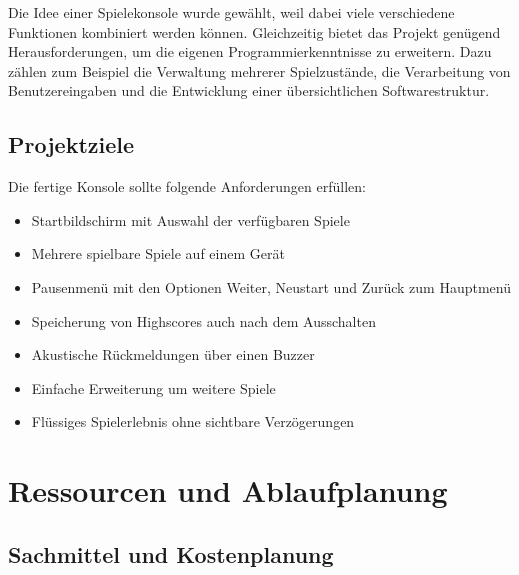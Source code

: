 \documentclass[12pt,a4paper]{article}
\begin{document}
Die Idee einer Spielekonsole wurde gewählt, weil dabei viele verschiedene Funktionen kombiniert werden können. Gleichzeitig bietet das Projekt genügend Herausforderungen, um die eigenen Programmierkenntnisse zu erweitern. Dazu zählen zum Beispiel die Verwaltung mehrerer Spielzustände, die Verarbeitung von Benutzereingaben und die Entwicklung einer übersichtlichen Softwarestruktur.

\subsection{Projektziele}

Die fertige Konsole sollte folgende Anforderungen erfüllen:

\begin{itemize}[noitemsep]
\item Startbildschirm mit Auswahl der verfügbaren Spiele
\item Mehrere spielbare Spiele auf einem Gerät
\item Pausenmenü mit den Optionen Weiter, Neustart und Zurück zum Hauptmenü
\item Speicherung von Highscores auch nach dem Ausschalten
\item Akustische Rückmeldungen über einen Buzzer
\item Einfache Erweiterung um weitere Spiele
\item Flüssiges Spielerlebnis ohne sichtbare Verzögerungen
\end{itemize}


\section{Ressourcen und Ablaufplanung}

\subsection{Sachmittel und Kostenplanung}
\end{document}
